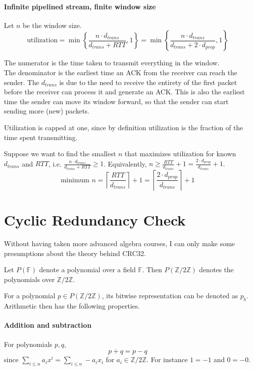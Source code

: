 \documentclass[a4paper]{article}
\newcommand{\set}[1]{\left\lbrace#1\right\rbrace} %
\newcommand{\ceil}[1]{\left\lceil #1\right\rceil}
\newcommand{\cyclic}[1]{\mathbb{Z}/#1\mathbb{Z}}
\begin{document}
\paragraph{Infinite pipelined stream, finite window size} Let $n$ be the window size.
\begin{equation}
	\text{utilization} = \min\set{\frac{n\cdot d_{trans}}{d_{trans} + RTT}, 1} = \min\set{\frac{n\cdot d_{trans}}{d_{trans} + 2\cdot d_{prop}}, 1}
\end{equation}

The numerator is the time taken to transmit everything in the window.\\
The denominator is the earliest time an ACK from the receiver can reach the sender. The $d_{trans}$ is due to the need to receive the entirety of the first packet before the receiver can process it and generate an ACK. This is also the earliest time the sender can move its window forward, so that the sender can start sending more (new) packets.

Utilization is capped at one, since by definition utilization is the fraction of the time spent transmitting.

Suppose we want to find the smallest $n$ that maximizes utilization for known $d_{trans}$ and $RTT$, i.e. $\frac{n\cdot d_{trans}}{d_{trans} + RTT}\geq 1$. Equivalently, $n\geq \frac{RTT}{d_{trans}} + 1 = \frac{2\cdot d_{prop}}{d_{trans}} + 1$.
\begin{equation}
	\text{minimum }n = \ceil{\frac{RTT}{d_{trans}}}+1 = \ceil{\frac{2\cdot d_{prop}}{d_{trans}}}+1
\end{equation}
 

\section{Cyclic Redundancy Check}
Without having taken more advanced algebra courses, I can only make some presumptions about the theory behind CRC32.

Let $P(\mathbb{F})$ denote a polynomial over a field $\mathbb{F}$. Then $P(\cyclic{2})$ denotes the polynomials over $\cyclic{2}$.

For a polynomial $p\in P(\cyclic{2})$, its bitwise representation can be denoted as $p_b$. Arithmetic then has the following properties.

\paragraph{Addition and subtraction} For polynomials $p, q$,
\begin{equation}
	p + q = p - q
\end{equation}
since $\sum_{i\leq n}a_ix^i = \sum_{i\leq n}-a_ix_i$ for $a_i\in \cyclic{2}$. For instance $1 = -1$ and $0 = -0$.
\end{document}
